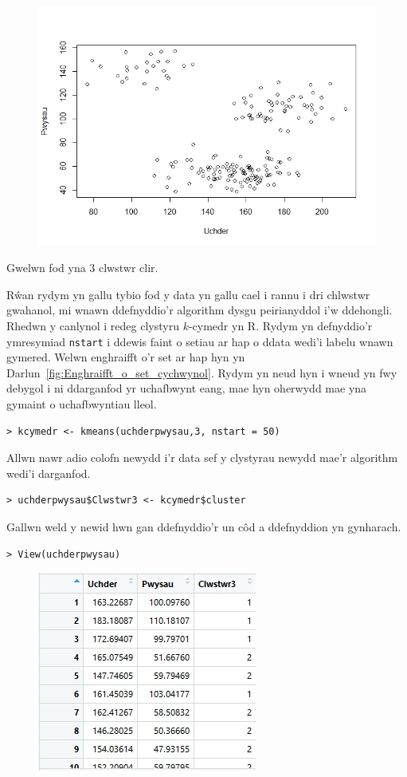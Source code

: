 \begin{figure}[H]
\begin{center}
\includegraphics[width=0.5\linewidth]{../img/ScatterplotR.jpeg}
\end{center}
\label{fig:ScatterplotR}
\end{figure}

Gwelwn fod yna 3 clwstwr clir. 

R\^{w}an rydym yn gallu tybio fod y data yn gallu cael i rannu i dri chlwstwr gwahanol, mi wnawn ddefnyddio'r algorithm dysgu peirianyddol i'w ddehongli. Rhedwn y canlynol i redeg clystyru $k$-cymedr yn R. Rydym yn defnyddio'r ymresymiad \texttt{nstart} i ddewis faint o setiau ar hap o ddata wedi'i labelu wnawn gymered. Welwn enghraifft o'r set ar hap hyn yn Darlun~\ref{fig:Enghraifft_o_set_cychwynol}. Rydym yn neud hyn i wneud yn fwy debygol i ni ddarganfod yr uchafbwynt eang, mae hyn oherwydd mae yna gymaint o uchafbwyntiau lleol.

\begin{verbatim}
> kcymedr <- kmeans(uchderpwysau,3, nstart = 50)
\end{verbatim}

Allwn nawr adio colofn newydd i'r data sef y clystyrau newydd mae'r algorithm wedi'i darganfod.

\begin{verbatim}
> uchderpwysau$Clwstwr3 <- kcymedr$cluster
\end{verbatim}

Gallwn weld y newid hwn gan ddefnyddio'r un c\^{o}d a ddefnyddion yn gynharach.

\begin{verbatim}
> View(uchderpwysau)
\end{verbatim}

\begin{figure}[H]
\begin{center}
\includegraphics[width=0.5\linewidth]{../img/Data3_yn_R.jpg}
\end{center}
\end{figure}

